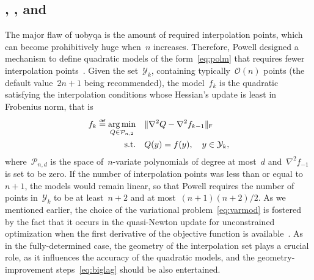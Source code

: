 \documentclass[11pt,draft]{article}
\numberwithin{equation}{section}
\DeclareMathOperator*\argmin{arg\,min}
\def\defeq{\ensuremath{\mathrel{\stackrel{\text{\tiny\textsf{def}}}{=}}}}
\newcommand\norm[2][]{#1\|#2#1\|}
\def\obj{\ensuremath{f}}
\newcommand\objmdl[1][k]{\obj_{#1}}
\newcommand\itpls[1][k]{\mathcal{Y}_{#1}}
\begin{document}
\subsection{, , and~}

The major flaw of \gls{uobyqa} is the amount of required interpolation points, which can become prohibitively huge when~$n$ increases.
Therefore, Powell designed a mechanism to define quadratic models of the form~\eqref{eq:polm} that requires fewer interpolation points~\cite{Powell_2004a}.
Given the set~$\itpls$, containing typically~$\mathcal{O}(n)$ points (the default value~$2n + 1$ being recommended), the model~$\objmdl$ is the quadratic satisfying the interpolation conditions whose Hessian's update is least in Frobenius norm, that is
\begin{equation}
    \label{eq:varmod}
    \begin{aligned}
        \objmdl \defeq \argmin_{Q \in \mathcal{P}_{n, 2}}    & \quad \norm{\nabla^2 Q - \nabla^2 \objmdl[k - 1]}_{\mathsf{F}}\\
        \text{s.t.}                                 & \quad Q(y) = \obj(y), \quad y \in \itpls,
    \end{aligned}
\end{equation}
where~$\mathcal{P}_{n, d}$ is the space of~$n$-variate polynomials of degree at most~$d$ and~$\nabla^2 \objmdl[-1]$ is set to be zero.
If the number of interpolation points was less than or equal to~$n + 1$, the models would remain linear, so that Powell requires the number of points in~$\itpls$ to be at least~$n + 2$ and at most~$(n + 1)(n + 2) / 2$.
As we mentioned earlier, the choice of the variational problem~\eqref{eq:varmod} is fostered by the fact that it occurs in the quasi-Newton update for unconstrained optimization when the first derivative of the objective function is available~\cite[\S 3.6]{Fletcher_1987}.
As in the fully-determined case, the geometry of the interpolation set plays a crucial role, as it influences the accuracy of the quadratic models, and the geometry-improvement steps~\eqref{eq:biglag} should be also entertained.
\end{document}
